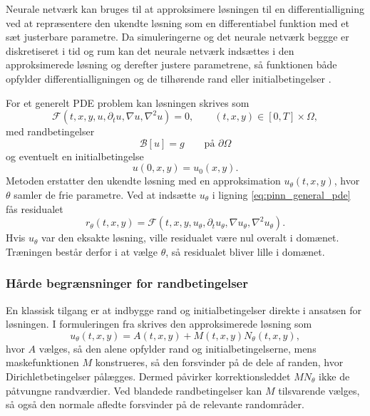 Neurale netværk kan bruges til at approksimere løsningen til en differentialligning ved at repræsentere den ukendte løsning som en differentiabel
funktion med et sæt justerbare parametre. Da simuleringerne og det neurale netværk beggge er diskretiseret i tid og rum kan 
det neurale netværk indsættes i den approksimerede løsning og derefter justere parametrene, så funktionen både opfylder differentialligningen og de tilhørende rand eller 
initialbetingelser \cite{lagaris1997ann_pde}.

For et generelt PDE problem kan løsningen skrives som
\begin{equation}
    \mathcal{F}\!\left(t,x,y,u,\partial_t u,\nabla u,\nabla^2 u\right)=0,
    \qquad
    (t,x,y) \in [0,T]\times\Omega ,
    \label{eq:pinn_general_pde}
\end{equation}
med randbetingelser
\begin{equation}
    \mathcal{B}[u] = g
    \qquad \text{på } \partial \Omega
    \label{eq:pinn_bc}
\end{equation}
og eventuelt en initialbetingelse
\begin{equation}
    u(0,x,y)=u_0(x,y).
    \label{eq:pinn_ic}
\end{equation}
Metoden erstatter den ukendte løsning med en approksimation $u_\theta(t,x,y)$, hvor $\theta$ samler de frie parametre. Ved at indsætte $u_\theta$ i ligning \eqref{eq:pinn_general_pde} fås residualet
\begin{equation}
    r_\theta(t,x,y)
    =
    \mathcal{F}\!\left(t,x,y,u_\theta,\partial_t u_\theta,\nabla u_\theta,\nabla^2 u_\theta\right).
    \label{eq:pinn_residual}
\end{equation}
Hvis $u_\theta$ var den eksakte løsning, ville residualet være nul overalt i domænet. Træningen består derfor i at vælge $\theta$, så residualet
bliver lille i domænet.

\subsubsection{Hårde begrænsninger for randbetingelser}
En klassisk tilgang er at indbygge rand og initialbetingelser direkte i ansatsen for løsningen. I formuleringen fra \cite{lagaris1997ann_pde} skrives den approksimerede løsning som
\begin{equation}
    u_\theta(t,x,y) = A(t,x,y) + M(t,x,y)N_\theta(t,x,y),
    \label{eq:pinn_trial_solution}
\end{equation}
hvor $A$ vælges, så den alene opfylder rand og initialbetingelserne, mens maskefunktionen $M$ konstrueres, så den forsvinder på de dele af randen, hvor Dirichletbetingelser pålægges. Dermed påvirker korrektionsleddet $M N_\theta$ ikke de påtvungne randværdier. Ved blandede randbetingelser kan $M$ tilsvarende vælges, så også den normale afledte forsvinder på de relevante randområder.

